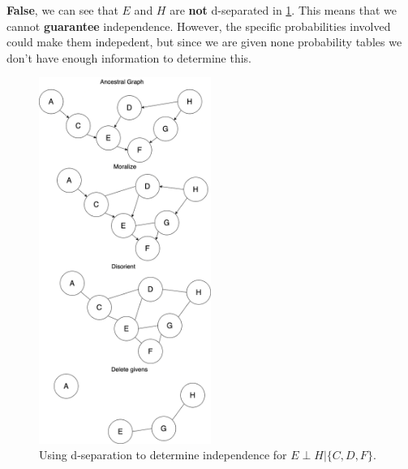 \documentclass[10pt, a4paper, english]{../Template/NTNUoving}
\begin{document}
\begin{oppgave}
    \begin{punkt}
        \textbf{False}, we can see that $E$ and $H$ are \textbf{not} d-separated in \ref{fig:2d}. This means that we cannot \textbf{guarantee} independence. However, the specific
        probabilities involved could make them indepedent, but since we are given none probability tables we don't have enough information to determine this.
        \begin{figure}[H]
            \centering
            \includegraphics[width=0.5\textwidth]{Task2d.png}
            \caption{Using d-separation to determine independence for $E \perp H | \{C, D, F\}$.}
            \label{fig:2d}
            \end{figure}
    \end{punkt}
\end{oppgave}
\end{document}
